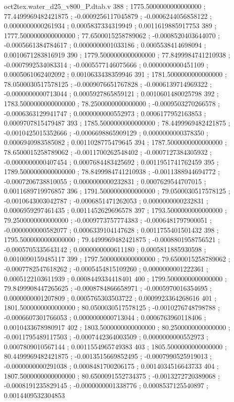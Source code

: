 \begin{filecontents}[overwrite]{oct2tex.water_d25_v800_P.dtab.v}
388 ; 1775.5000000000000000 ; 77.4499969482421875 ; -0.0009256117045879 ; -0.0006244056858122 ; 0.0000000000261934 ; 0.0005837334319949 ; 0.0011619885917753
389 ; 1777.5000000000000000 ; 77.6500015258789062 ; -0.0008520403644070 ; -0.0005661384784617 ; 0.0000000001033186 ; 0.0005538414698094 ; 0.0010671283816919
390 ; 1779.5000000000000000 ; 77.8499984741210938 ; -0.0007992534083314 ; -0.0005577146075666 ; 0.0000000000451109 ; 0.0005061062402092 ; 0.0010633438359946
391 ; 1781.5000000000000000 ; 78.0500030517578125 ; -0.0009076651767828 ; -0.0006139714969322 ; -0.0000000000713044 ; 0.0005927865859121 ; 0.0010601480025798
392 ; 1783.5000000000000000 ; 78.2500000000000000 ; -0.0009503270266578 ; -0.0006363129941747 ; 0.0000000000552973 ; 0.0006177952163853 ; 0.0009707815479487
393 ; 1785.5000000000000000 ; 78.4499969482421875 ; -0.0010425015352666 ; -0.0006698865909129 ; 0.0000000000378350 ; 0.0006940983585082 ; 0.0011028775479645
394 ; 1787.5000000000000000 ; 78.6500015258789062 ; -0.0011700262548402 ; -0.0007127384305932 ; -0.0000000000407454 ; 0.0007684483425692 ; 0.0011951741762459
395 ; 1789.5000000000000000 ; 78.8499984741210938 ; -0.0011388944694772 ; -0.0007206738810055 ; 0.0000000000232831 ; 0.0007629544707015 ; 0.0011689719976857
396 ; 1791.5000000000000000 ; 79.0500030517578125 ; -0.0010643003042787 ; -0.0006851471262053 ; 0.0000000000232831 ; 0.0006959297461435 ; 0.0011452629696578
397 ; 1793.5000000000000000 ; 79.2500000000000000 ; -0.0009773757774383 ; -0.0006481797900051 ; -0.0000000000582077 ; 0.0006339104147628 ; 0.0011755401501432
398 ; 1795.5000000000000000 ; 79.4499969482421875 ; -0.0008801958756521 ; -0.0005705335643142 ; 0.0000000000611180 ; 0.0005811885930598 ; 0.0010090159485117
399 ; 1797.5000000000000000 ; 79.6500015258789062 ; -0.0007782547618262 ; -0.0005454815109260 ; 0.0000000001222361 ; 0.0005122103611939 ; 0.0008449334418401
400 ; 1799.5000000000000000 ; 79.8499908447265625 ; -0.0008784866658971 ; -0.0005970016354695 ; 0.0000000001207809 ; 0.0005765303503722 ; 0.0009923364268616
401 ; 1801.5000000000000000 ; 80.0500030517578125 ; -0.0010276748798788 ; -0.0006607301766053 ; 0.0000000000713044 ; 0.0006763960118406 ; 0.0010433678980917
402 ; 1803.5000000000000000 ; 80.2500000000000000 ; -0.0011795489117503 ; -0.0007442364003509 ; 0.0000000000552973 ; 0.0007809010567144 ; 0.0011554965749383
403 ; 1805.5000000000000000 ; 80.4499969482421875 ; -0.0013515669852495 ; -0.0007990525919013 ; -0.0000000000291038 ; 0.0008481700206175 ; 0.0014034516643733
404 ; 1807.5000000000000000 ; 80.6500091552734375 ; -0.0013272720389068 ; -0.0008191235829145 ; -0.0000000001338776 ; 0.0008537125540897 ; 0.0014409532304853

\end{filecontents}
